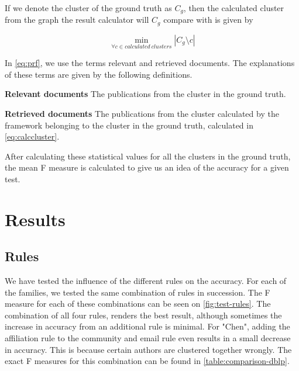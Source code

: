 If we denote the cluster of the ground truth as $C_g$, then the calculated cluster from the graph the result calculator will $C_g$ compare with is given by 

\begin{equation}
	\label{eq:calccluster}
	\min_{\forall c \in calculated~clusters}{\left| C_g \setminus c \right|}
\end{equation}

In \autoref{eq:prf}, we use the terms relevant and retrieved documents. The explanations of these terms are given by the following definitions.

\begin{mydef}
	\textbf{Relevant documents} The publications from the cluster in the ground truth.
\end{mydef}

\begin{mydef}
	\textbf{Retrieved documents} The publications from the cluster calculated by the framework belonging to the cluster in the ground truth, calculated in \autoref{eq:calccluster}.
\end{mydef}

After calculating these statistical values for all the clusters in the ground truth, the mean F measure is calculated to give us an idea of the accuracy for a given test.

\section{Results}

\subsection{Rules}

We have tested the influence of the different rules on the accuracy. For each of the families, we tested the same combination of rules in succession. The F measure for each of these combinations can be seen on \autoref{fig:test-rules}. The combination of all four rules, renders the best result, although sometimes the increase in accuracy from an additional rule is minimal. For "Chen", adding the affiliation rule to the community and email rule even results in a small decrease in accuracy. This is because certain authors are clustered together wrongly. The exact F measures for this combination can be found in \autoref{table:comparison-dblp}. 

